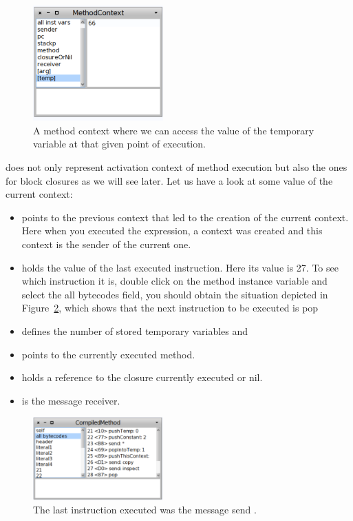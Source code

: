 \documentclass[a4paper,10pt,twoside]{book}
\begin{document}
\begin{figure}[!h]
\begin{center}\includegraphics[width=5cm]{OneContext}
\caption{A method context where we can access the value of the temporary variable  at that given point of execution.\label{oneContext}}
\end{center}
\end{figure}

 does not only represent activation context of method execution but also
the ones for block closures as we will see later. Let us have a look at some value of the current context:

\begin{itemize}
\item {} points to the previous context that led to the creation of the current context. Here when you executed the expression, a context was created and this context is the sender of the current one.

\item {} holds the value of the last executed instruction. Here its value is 27. To see which instruction it is, double click on the method instance variable and select the all bytecodes field, you should obtain the situation depicted in Figure~\ref{ByteCodes}, which shows that the next instruction to be executed is pop 

\item {} defines the number of stored temporary variables and

\item {} points to the currently executed method.

\item {} holds a reference to the closure currently executed or nil.

\item {} is the message receiver.
\end{itemize}


\begin{figure}[!h]
\begin{center}\includegraphics[width=5cm]{ByteCodes}
\caption{The last instruction executed was the message send .\label{ByteCodes}}
\end{center}
\end{figure}
\end{document}
